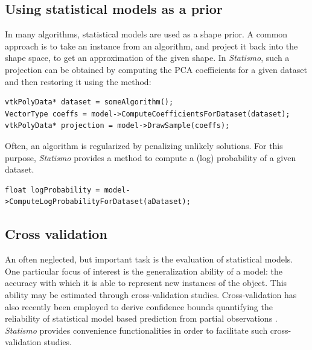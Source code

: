 \documentclass{InsightArticle}
\newcommand{\Statismo}{\emph{Statismo}\xspace}
\begin{document}
\subsection{Using statistical models as  a prior}
In many algorithms, statistical models are used as a shape prior. 
A common approach is to take an instance from an algorithm, and project it back into the 
shape space, to get an approximation of the given shape. In \Statismo, such a projection can be
obtained by computing the PCA coefficients for a given dataset and then restoring it using the 
 method:
\begin{verbatim}
vtkPolyData* dataset = someAlgorithm();
VectorType coeffs = model->ComputeCoefficientsForDataset(dataset);
vtkPolyData* projection = model->DrawSample(coeffs);
\end{verbatim}
Often, an algorithm is regularized by penalizing unlikely solutions. For this purpose, \Statismo 
provides a method to compute a (log) probability of a given dataset. 
\begin{verbatim}
float logProbability = model->ComputeLogProbabilityForDataset(aDataset);
\end{verbatim}

\subsection{Cross validation}
An often neglected, but important task is the evaluation of
statistical models. One particular focus of interest is the
generalization ability of a model: the accuracy with which it is able to represent new instances of the object. 
This ability may be estimated through cross-validation studies. Cross-validation has also recently been employed
to derive confidence bounds quantifying the reliability of statistical model based prediction from partial observations \cite{blanc_estimating_2009,blanc_confidence_2012}. \Statismo provides convenience functionalities in order to facilitate such cross-validation studies. 
\end{document}
